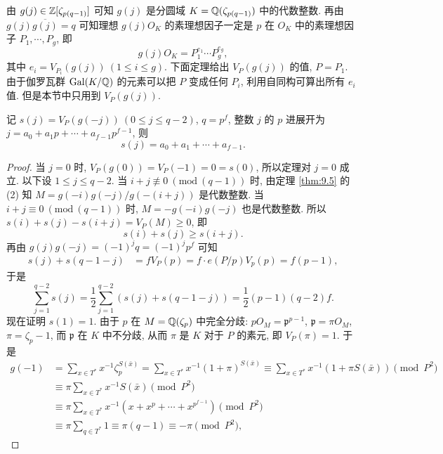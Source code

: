 由 $g(j)\in\mathbb{Z}[\zeta_{p(q-1)}]$ 可知 $g(j)$ 是分圆域 $K=\mathbb{Q}(\zeta_{p(q-1)})$ 中的代数整数. 再由 $g(j)\overline{g(j)}=q$ 可知理想 $g(j)O_K$ 的素理想因子一定是 $p$ 在 $O_K$ 中的素理想因子 $P_1,\cdots,P_g$, 即
\[
  g(j)O_K=P_1^{e_1}\cdots P_g^{e_g},
\]
其中 $e_i=V_{P_i}(g(j))\ (1\leqslant i\leqslant g)$. 下面定理给出 $V_P(g(j))$ 的值, $P=P_1$. 由于伽罗瓦群 $\operatorname{Gal}(K/\mathbb{Q})$ 的元素可以把 $P$ 变成任何 $P_i$, 利用自同构可算出所有 $e_i$ 值. 但是本节中只用到 $V_P(g(j))$.

\begin{theorem}\label{thm:9.6}
记 $s(j)=V_P(g(-j))\ (0\leqslant j\leqslant q-2)$, $q=p^f$, 整数 $j$ 的 $p$ 进展开为 $j=a_0+a_1p+\cdots+a_{f-1}p^{f-1}$, 则
\[
  s(j)=a_0+a_1+\cdots+a_{f-1}.
\]
\end{theorem}

\begin{proof}
当 $j=0$ 时, $V_P(g(0))=V_P(-1)=0=s(0)$, 所以定理对 $j=0$ 成立. 以下设 $1\leqslant j\leqslant q-2$. 当 $i+j\not\equiv 0\ (\mathrm{mod}\ (q-1))$ 时, 由定理 \ref{thm:9.5} 的 (2) 知 $M=g(-i)g(-j)/g(-(i+j))$ 是代数整数. 当 $i+j\equiv 0\ (\mathrm{mod}\ (q-1))$ 时, $M=-g(-i)g(-j)$ 也是代数整数. 所以 $s(i)+s(j)-s(i+j)=V_P(M)\geqslant 0$, 即
\begin{equation}\tag{2}
  s(i)+s(j)\geqslant s(i+j).
\end{equation}
再由 $g(j)g(-j)=(-1)^jq=(-1)^jp^f$ 可知
\begin{align*}
  s(j)+s(q-1-j)&=fV_P(p)=f\cdot e(P/p)V_p(p)=f(p-1),
\end{align*}
于是
\begin{equation}\tag{3}
  \sum_{j=1}^{q-2}s(j)=\frac{1}{2}\sum_{j=1}^{q-2}(s(j)+s(q-1-j))
  =\frac{1}{2}(p-1)(q-2)f.
\end{equation}
现在证明 $s(1)=1$. 由于 $p$ 在 $M=\mathbb{Q}(\zeta_p)$ 中完全分歧: $pO_M=\mathfrak{p}^{p-1}$, $\mathfrak{p}=\pi O_M$, $\pi=\zeta_p-1$, 而 $\mathfrak{p}$ 在 $K$ 中不分歧, 从而 $\pi$ 是 $K$ 对于 $P$ 的素元, 即 $V_P(\pi)=1$. 于是
\begin{align*}
  g(-1)&=\sum_{x\in T^*}x^{-1}\zeta_p^{S(\bar{x})}
  =\sum_{x\in T^*}x^{-1}(1+\pi)^{S(\bar{x})}
  \equiv\sum_{x\in T^*}x^{-1}(1+\pi S(\bar{x}))\pmod{P^2}\\
  &\equiv\pi\sum_{x\in T^*}x^{-1}S(\bar{x})\pmod{P^2}\\
  &\equiv\pi\sum_{x\in T^*}x^{-1}(x+x^p+\cdots+x^{p^{f-1}})\pmod{P^2}\\
  &\equiv\pi\sum_{q\in T^*}1\equiv\pi(q-1)\equiv-\pi\pmod{P^2},
\end{align*}

\end{proof}
